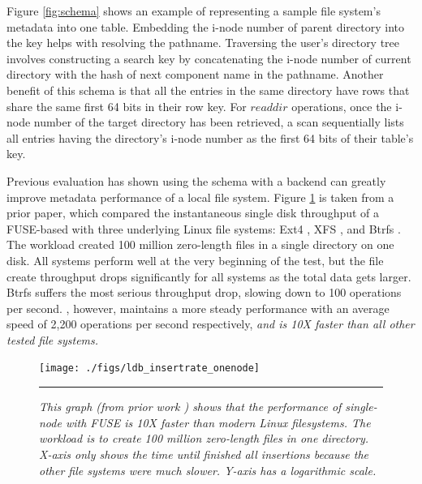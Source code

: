 Figure \ref{fig:schema} shows an example of representing
a sample file system's metadata into one table.
Embedding the i-node number of parent directory into the key
helps with resolving the pathname.
Traversing the user's directory tree
involves constructing a search key by concatenating the i-node
number of current directory with the hash of
next component name in the pathname.
Another benefit of this schema is that all the entries
in the same directory have rows that
share the same first 64 bits in their row key.
For $readdir$ operations, once the i-node number
of the target directory has been retrieved,
a scan sequentially lists all entries having
the directory's i-node number as the first 64 bits of their table's key.

Previous evaluation \cite{TableFS} has shown using
the \tfs schema with a \ldb backend
can greatly improve metadata performance of a local file system.
Figure \ref{graph:ldb-singlenode} is taken from a prior \tfs paper,
which compared the instantaneous single disk throughput of a FUSE-based \tfs
with three underlying Linux file systems: Ext4 \cite{Ext4}, XFS \cite{XFS}, and
Btrfs \cite{BTRFS}.
The workload created 100 million zero-length files in a single directory
on one disk.
All systems perform well at the very beginning of the test, but the file create
throughput drops significantly for all systems as the total data gets larger.
Btrfs suffers the most serious throughput drop, slowing down to 100 operations
per second.
\tfs, however, maintains a more steady performance
with an average speed of 2,200 operations per second respectively,
\textit{and is 10X faster than all other tested file systems.}

\begin{figure}[t]  %
\centerline{\texttt{[image: ./figs/ldb\_insertrate\_onenode]}}
\vspace{10pt}
\caption{\textit{
This graph (from prior work \cite{TableFS}) shows
that the performance of single-node \tfs with FUSE is 10X faster than modern Linux
filesystems. The workload is to create 100 million zero-length files in one directory.
X-axis only shows the time until \tfs finished all insertions because the other
file systems were much slower. Y-axis has a logarithmic scale.}
}
\hrule 
\label{graph:ldb-singlenode}
\end{figure}       %
